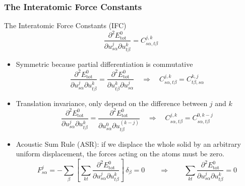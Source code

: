 \begin{frame}
  \frametitle{The Interatomic Force Constants}
  The Interatomic Force Constants (IFC)
  \begin{equation*}
    \frac{
      \partial^2 E^0_{\text{tot}}
    }{
      \partial {u}_{s\alpha}^j
      \partial {u}_{t\beta}^k
    }
    =
    C_{s\alpha, t\beta}^{j, k}
  \end{equation*}

  \begin{itemize}
  \item Symmetric because partial differentiation is commutative
    \begin{equation}
      \label{eq:ifc_sym_prop}
        \frac{
        \partial^2 E^0_{\text{tot}}
        }{
        \partial {u}_{s\alpha}^j
        \partial {u}_{t\beta}^k
        }
        =
        \frac{
        \partial^2 E^0_{\text{tot}}
        }{
        \partial {u}_{t\beta}^k
        \partial {u}_{s\alpha}^j
        }
        \quad \Rightarrow \quad
        C_{s\alpha, t\beta}^{j, k}
        =
        C_{t\beta, s\alpha}^{k, j}
    \end{equation}
  \item Translation invariance, only depend on the difference between $j$ and $k$
    \begin{equation}
      \label{eq:ifc_ti_prop}
        \frac{
        \partial^2 E^0_{\text{tot}}
        }{
        \partial {u}_{s\alpha}^j
        \partial {u}_{t\beta}^k
        }
        =
        \frac{
        \partial^2 E^0_{\text{tot}}
        }{
        \partial {u}_{s\alpha}^0
        \partial {u}_{t\beta}^{(k-j)}
        }
        \quad \Rightarrow \quad
        C_{s\alpha, t\beta}^{j, k}
        =
        C_{s\alpha, t\beta}^{0, k-j}
    \end{equation}
  \item Acoustic Sum Rule (ASR): if we displace the whole solid by an arbitrary uniform
    displacement, the forces acting on the atoms must be zero.
    \begin{equation}
      \label{eq:ifc_asr_prop}
      F_{s\alpha}^j =
      - \sum_{\beta}
      \left[
        \sum_{kt}
        \frac{
        \partial^2 E^0_{\text{tot}}
        }{
        \partial {u}_{s\alpha}^j
        \partial {u}_{t\beta}^k
        }
      \right]
      \,
      \delta_\beta
      = 0
      \qquad\Rightarrow\qquad
      \sum_{kt}
        \frac{
        \partial^2 E^0_{\text{tot}}
        }{
        \partial {u}_{s\alpha}^j
        \partial {u}_{t\beta}^k
        } = 0
      \end{equation}
  \end{itemize}
\end{frame}
